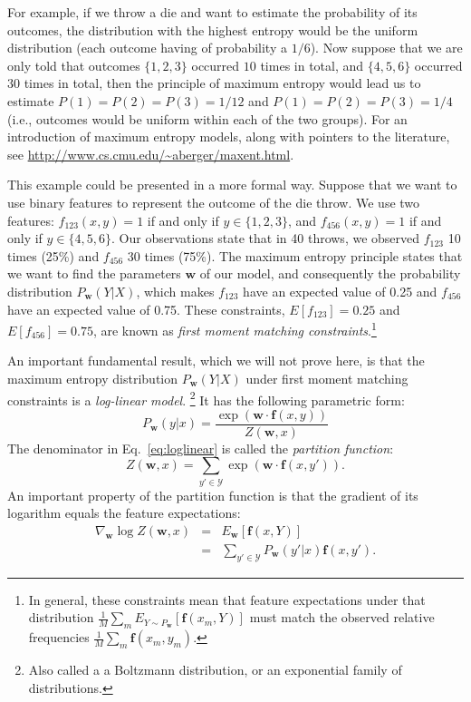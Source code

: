 For example, if we throw a die and want to estimate the probability of its outcomes, the distribution with the highest entropy would be the 
uniform distribution (each outcome having of probability a $1/6$). 
Now suppose that we are only told that outcomes $\{1,2,3\}$ occurred $10$ times in total, and 
$\{4,5,6\}$ occurred $30$ times in total, then the principle of maximum entropy would lead us to 
estimate $P(1)=P(2)=P(3)=1/12$ and $P(1)=P(2)=P(3)=1/4$ (i.e., outcomes would be uniform 
within each of the two groups). For an introduction of maximum entropy models, along with pointers to the literature, see 
\url{http://www.cs.cmu.edu/~aberger/maxent.html}.

This example could be presented in a more formal way. Suppose that we want to use binary features to represent the outcome of the die throw. We use two features: $f_{123}(x,y) = 1$ if and only if $y \in \{1,2,3\}$, and $f_{456}(x,y) = 1$ if and only if $y \in \{4,5,6\}$. Our observations state that in 40 throws, we observed $f_{123}$ 10 times (25\%) and $f_{456}$ 30 times (75\%). The maximum entropy principle states that we want to find the parameters $\boldsymbol{w}$ of our model, and consequently the probability distribution $P_{\boldsymbol{w}}(Y|X)$, which makes $f_{123}$ have an expected value of 0.25 and $f_{456}$ have an expected value of 0.75. These constraints, $E[f_{123}] = 0.25$ and $E[f_{456}] = 0.75$, are known as \emph{first moment matching constraints}.\footnote{In general, these constraints mean that
feature expectations under that distribution $\frac{1}{M}\sum_m E_{Y \sim P_{\boldsymbol{w}}}[\boldsymbol{f}(x_m,Y)]$ 
must match the observed relative frequencies 
 $\frac{1}{M}\sum_m \boldsymbol{f}(x_m,y_m)$.}

An important fundamental result, which we will not prove here, is that the maximum entropy distribution $P_{\boldsymbol{w}}(Y|X)$ under first moment matching constraints  
is a \emph{log-linear model}.
\footnote{Also called a a Boltzmann distribution, or an exponential family of 
distributions.} %
It has the following parametric form: 
\begin{equation}\label{eq:loglinear}
P_{\boldsymbol{w}}(y|x) = \frac{\exp(\boldsymbol{w} \cdot \boldsymbol{f}(x,y))}{Z(\boldsymbol{w},x)}
\end{equation}
The denominator in Eq.~\ref{eq:loglinear} is called the \emph{partition function}:
\begin{equation}
Z(\boldsymbol{w},x) = \sum_{y' \in \mathcal{Y}} \exp(\boldsymbol{w} \cdot \boldsymbol{f}(x,y')).
\end{equation}
An important property of the partition function is that the gradient of its logarithm equals 
the feature expectations: 
\begin{eqnarray}
\nabla_{\boldsymbol{w}} \log Z(\boldsymbol{w},x) &=& E_{\boldsymbol{w}} [\boldsymbol{f}(x,Y)]\nonumber\\
&=& \sum_{y' \in \mathcal{Y}} P_{\boldsymbol{w}}(y'|x) \boldsymbol{f}(x,y').
\end{eqnarray}

